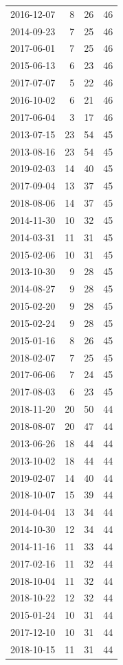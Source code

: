 \begin{tabular}{lrrr}
2016-12-07 & 8 & 26 & 46 \\
2014-09-23 & 7 & 25 & 46 \\
2017-06-01 & 7 & 25 & 46 \\
2015-06-13 & 6 & 23 & 46 \\
2017-07-07 & 5 & 22 & 46 \\
2016-10-02 & 6 & 21 & 46 \\
2017-06-04 & 3 & 17 & 46 \\
2013-07-15 & 23 & 54 & 45 \\
2013-08-16 & 23 & 54 & 45 \\
2019-02-03 & 14 & 40 & 45 \\
2017-09-04 & 13 & 37 & 45 \\
2018-08-06 & 14 & 37 & 45 \\
2014-11-30 & 10 & 32 & 45 \\
2014-03-31 & 11 & 31 & 45 \\
2015-02-06 & 10 & 31 & 45 \\
2013-10-30 & 9 & 28 & 45 \\
2014-08-27 & 9 & 28 & 45 \\
2015-02-20 & 9 & 28 & 45 \\
2015-02-24 & 9 & 28 & 45 \\
2015-01-16 & 8 & 26 & 45 \\
2018-02-07 & 7 & 25 & 45 \\
2017-06-06 & 7 & 24 & 45 \\
2017-08-03 & 6 & 23 & 45 \\
2018-11-20 & 20 & 50 & 44 \\
2018-08-07 & 20 & 47 & 44 \\
2013-06-26 & 18 & 44 & 44 \\
2013-10-02 & 18 & 44 & 44 \\
2019-02-07 & 14 & 40 & 44 \\
2018-10-07 & 15 & 39 & 44 \\
2014-04-04 & 13 & 34 & 44 \\
2014-10-30 & 12 & 34 & 44 \\
2014-11-16 & 11 & 33 & 44 \\
2017-02-16 & 11 & 32 & 44 \\
2018-10-04 & 11 & 32 & 44 \\
2018-10-22 & 12 & 32 & 44 \\
2015-01-24 & 10 & 31 & 44 \\
2017-12-10 & 10 & 31 & 44 \\
2018-10-15 & 11 & 31 & 44 \\

\end{tabular}
